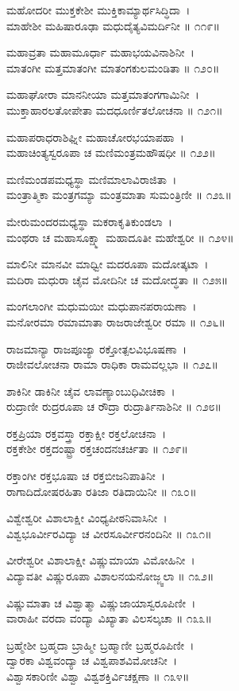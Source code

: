 ಮಹೋದರೀ ಮುಕ್ತಕೇಶೀ ಮುಕ್ತಿಕಾಮ್ಯಾರ್ಥಸಿದ್ಧಿದಾ~।\\
ಮಾಹೇಶೀ ಮಹಿಷಾರೂಢಾ ಮಧುದೈತ್ಯವಿಮರ್ದಿನೀ ॥ ೧೧೯॥

ಮಹಾವ್ರತಾ ಮಹಾಮೂರ್ಧಾ ಮಹಾಭಯವಿನಾಶಿನೀ~।\\
ಮಾತಂಗೀ ಮತ್ತಮಾತಂಗೀ ಮಾತಂಗಕುಲಮಂಡಿತಾ ॥ ೧೨೦॥

ಮಹಾಘೋರಾ ಮಾನನೀಯಾ ಮತ್ತಮಾತಂಗಗಾಮಿನೀ~।\\
ಮುಕ್ತಾಹಾರಲತೋಪೇತಾ ಮದಧೂರ್ಣಿತಲೋಚನಾ ॥ ೧೨೧॥

ಮಹಾಪರಾಧರಾಶಿಘ್ನೀ ಮಹಾಚೋರಭಯಾಪಹಾ~।\\
ಮಹಾಚಿಂತ್ಯಸ್ವರೂಪಾ ಚ ಮಣಿಮಂತ್ರಮಹೌಷಧೀ ॥ ೧೨೨॥

ಮಣಿಮಂಡಪಮಧ್ಯಸ್ಥಾ ಮಣಿಮಾಲಾವಿರಾಜಿತಾ~।\\
ಮಂತ್ರಾತ್ಮಿಕಾ ಮಂತ್ರಗಮ್ಯಾ ಮಂತ್ರಮಾತಾ ಸುಮಂತ್ರಿಣೀ ॥ ೧೨೩॥

ಮೇರುಮಂದರಮಧ್ಯಸ್ಥಾ ಮಕರಾಕೃತಿಕುಂಡಲಾ~।\\
ಮಂಥರಾ ಚ ಮಹಾಸೂಕ್ಷ್ಮಾ ಮಹಾದೂತೀ ಮಹೇಶ್ವರೀ ॥ ೧೨೪॥

ಮಾಲಿನೀ ಮಾನವೀ ಮಾಧ್ವೀ ಮದರೂಪಾ ಮದೋತ್ಕಟಾ~।\\
ಮದಿರಾ ಮಧುರಾ ಚೈವ ಮೋದಿನೀ ಚ ಮದೋದ್ಧತಾ ॥ ೧೨೫॥

ಮಂಗಲಾಂಗೀ ಮಧುಮಯೀ ಮಧುಪಾನಪರಾಯಣಾ~।\\
ಮನೋರಮಾ ರಮಾಮಾತಾ ರಾಜರಾಜೇಶ್ವರೀ ರಮಾ ॥ ೧೨೬॥

ರಾಜಮಾನ್ಯಾ ರಾಜಪೂಜ್ಯಾ ರಕ್ತೋತ್ಪಲವಿಭೂಷಣಾ~।\\
ರಾಜೀವಲೋಚನಾ ರಾಮಾ ರಾಧಿಕಾ ರಾಮವಲ್ಲಭಾ ॥ ೧೨೭॥

ಶಾಕಿನೀ ಡಾಕಿನೀ ಚೈವ ಲಾವಣ್ಯಾಂಬುಧಿವೀಚಿಕಾ~।\\
ರುದ್ರಾಣೀ ರುದ್ರರೂಪಾ ಚ ರೌದ್ರಾ ರುದ್ರಾರ್ತಿನಾಶಿನೀ ॥ ೧೨೮॥

ರಕ್ತಪ್ರಿಯಾ ರಕ್ತವಸ್ತ್ರಾ ರಕ್ತಾಕ್ಷೀ ರಕ್ತಲೋಚನಾ~।\\
ರಕ್ತಕೇಶೀ ರಕ್ತದಂಷ್ಟ್ರಾ ರಕ್ತಚಂದನಚರ್ಚಿತಾ ॥ ೧೨೯॥

ರಕ್ತಾಂಗೀ ರಕ್ತಭೂಷಾ ಚ ರಕ್ತಬೀಜನಿಪಾತಿನೀ~।\\
ರಾಗಾದಿದೋಷರಹಿತಾ ರತಿಜಾ ರತಿದಾಯಿನೀ ॥ ೧೩೦॥

ವಿಶ್ವೇಶ್ವರೀ ವಿಶಾಲಾಕ್ಷೀ ವಿಂಧ್ಯಪೀಠನಿವಾಸಿನೀ~।\\
ವಿಶ್ವಭೂರ್ವೀರವಿದ್ಯಾ ಚ ವೀರಸೂರ್ವೀರನಂದಿನೀ ॥ ೧೩೧॥

ವೀರೇಶ್ವರೀ ವಿಶಾಲಾಕ್ಷೀ ವಿಷ್ಣುಮಾಯಾ ವಿಮೋಹಿನೀ~।\\
ವಿದ್ಯಾವತೀ ವಿಷ್ಣುರೂಪಾ ವಿಶಾಲನಯನೋಜ್ಜ್ವಲಾ ॥ ೧೩೨॥

ವಿಷ್ಣುಮಾತಾ ಚ ವಿಶ್ವಾತ್ಮಾ ವಿಷ್ಣುಜಾಯಾಸ್ವರೂಪಿಣೀ~।\\
ವಾರಾಹೀ ವರದಾ ವಂದ್ಯಾ ವಿಖ್ಯಾತಾ ವಿಲಸಲ್ಕಚಾ ॥ ೧೩೩॥

ಬ್ರಹ್ಮೇಶೀ ಬ್ರಹ್ಮದಾ ಬ್ರಾಹ್ಮೀ ಬ್ರಹ್ಮಾಣೀ ಬ್ರಹ್ಮರೂಪಿಣೀ~।\\
ದ್ವಾರಕಾ ವಿಶ್ವವಂದ್ಯಾ ಚ ವಿಶ್ವಪಾಶವಿಮೋಚನೀ~।\\
ವಿಶ್ವಾಸಕಾರಿಣೀ ವಿಶ್ವಾ ವಿಶ್ವಶಕ್ತಿರ್ವಿಚಕ್ಷಣಾ ॥ ೧೩೪॥

